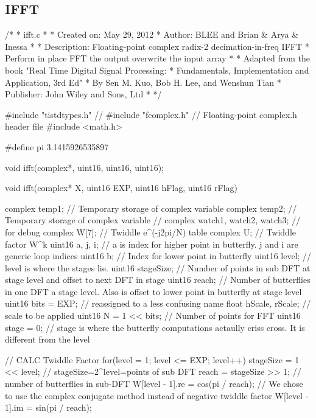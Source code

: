 \documentclass{bannerReport}
\begin{document}
\subsection{IFFT}
\begin{code}
/*
* ifft.c
*
*  Created on: May 29, 2012
*      Author: BLEE and Brian & Arya & Inessa
*
*  Description: Floating-point complex radix-2 decimation-in-freq IFFT
*               Perform in place FFT the output overwrite the input array
*
*  Adapted from the book "Real Time Digital Signal Processing:
*                Fundamentals, Implementation and Application, 3rd Ed"
*                By Sen M. Kuo, Bob H. Lee, and Wenshun Tian
*                Publisher: John Wiley and Sons, Ltd
* 
*/



#include "tistdtypes.h"
// #include "fcomplex.h"       // Floating-point complex.h header file 
#include <math.h>   


#define pi 3.1415926535897  

void ifft(complex*, uint16, uint16, uint16);

void ifft(complex* X, uint16 EXP, uint16 hFlag, uint16 rFlag)
{
	complex  temp1;	// Temporary storage of complex variable 
	complex	 temp2;	// Temporary storage of complex variable 
	// complex watch1, watch2, watch3; // for debug
	complex W[7];		// Twiddle e^(-j2pi/N) table 
	complex  U;     // Twiddle factor W^k 
	uint16 a, j, i;	// a is index for higher point in butterfly. j and i are
	generic loop indices
	uint16 b;		// Index for lower point in butterfly 
	uint16 level;	// level is where the stages lie.
	uint16 stageSize;	// Number of points in sub DFT at stage level and 
	offset to next DFT in stage 
	uint16 reach;		// Number of butterflies in one DFT a stage level.  
	Also is offset to lower point in butterfly at stage level 
	uint16 bits = EXP;	// reassigned to a less confusing name
	float hScale, rScale;		// scale to be applied
	uint16 N = 1 << bits;		// Number of points for FFT 
	uint16 stage = 0;			// stage is where the butterfly computations
	actaully criss cross. It is different from the level

	// CALC Twiddle Factor
	for(level = 1; level <= EXP; level++)				
	{
		stageSize = 1 << level;						// 
		stageSize=2^level=points of sub DFT
		reach = stageSize >> 1;						// number of butterflies
		in sub-DFT 
		W[level - 1].re = cos(pi / reach);			// We chose to use the 
		complex conjugate method instead of negative twiddle factor
		W[level - 1].im = sin(pi / reach);			
	}

}
\end{code}
\end{document}
